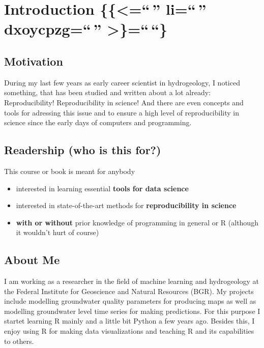 \documentclass[
  letterpaper,
  DIV=11,
  numbers=noendperiod]{scrreprt}
\providecommand{\tightlist}{%
  \setlength{\itemsep}{0pt}\setlength{\parskip}{0pt}}\usepackage{longtable,booktabs,array}
\begin{document}


\hypertarget{introduction-li-dxoycpzg}{%
\chapter{Introduction \{\{\textless=``\,'' li=``\,'' dxoycpzg=``\,''
\textgreater\}=``\,``\}}\label{introduction-li-dxoycpzg}}

\hypertarget{motivation}{%
\section{Motivation}\label{motivation}}

During my last few years as early career scientist in hydrogeology, I
noticed something, that has been studied and written about a lot
already: Reproducibility! Reproducibility in science! And there are even
concepts and tools for adressing this issue and to ensure a high level
of reproducibility in science since the early days of computers and
programming.

\hypertarget{readership-who-is-this-for}{%
\section{Readership (who is this
for?)}\label{readership-who-is-this-for}}

This course or book is meant for anybody

\begin{itemize}
\tightlist
\item
  interested in learning essential \textbf{tools for data science}
\item
  interested in state-of-the-art methods for \textbf{reproducibility in
  science}
\item
  \textbf{with or without} prior knowledge of programming in general or
  R (although it wouldn't hurt of course)
\end{itemize}

\hypertarget{about-me}{%
\section{About Me}\label{about-me}}

I am working as a researcher in the field of machine learning and
hydrogeology at the Federal Institute for Geoscience and Natural
Resources (BGR). My projects include modelling groundwater quality
parameters for producing maps as well as modelling groundwater level
time series for making predictions. For this purpose I startet learning
R mainly and a little bit Python a few years ago. Besides this, I enjoy
using R for making data visualizations and teaching R and its
capabilities to others.
\end{document}
